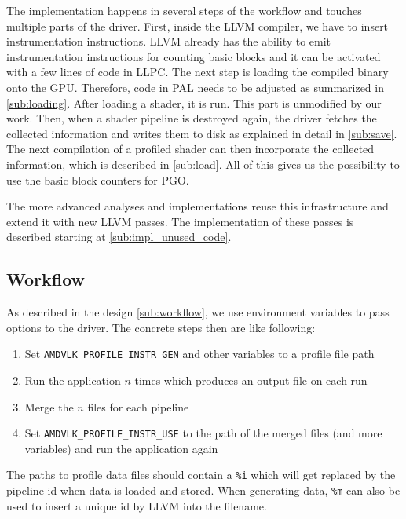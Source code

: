 \clearpage
{}
The implementation happens in several steps of the workflow and touches multiple parts of the driver.
First, inside the LLVM compiler, we have to insert instrumentation instructions.
LLVM already has the ability to emit instrumentation instructions for counting basic blocks and it can be activated with a few lines of code in LLPC.
The next step is loading the compiled binary onto the GPU. Therefore, code in PAL needs to be adjusted as summarized in \cref{sub:loading}.
After loading a shader, it is run. This part is unmodified by our work.
Then, when a shader pipeline is destroyed again, the driver fetches the collected information and writes them to disk as explained in detail in \cref{sub:save}.
The next compilation of a profiled shader can then incorporate the collected information, which is described in \cref{sub:load}. All of this gives us the possibility to use the basic block counters for PGO.

The more advanced analyses and implementations reuse this infrastructure and extend it with new LLVM passes. The implementation of these passes is described starting at \cref{sub:impl_unused_code}.

\subsection{Workflow}
\label{sub:impl_workflow}
As described in the design \cref{sub:workflow}, we use environment variables to pass options to the driver.
The concrete steps then are like following:
\begin{enumerate}
	\item Set \texttt{AMDVLK\_PROFILE\_INSTR\_GEN} and other variables to a profile file path
	\item Run the application $n$ times which produces an output file on each run
	\item Merge the $n$ files for each pipeline
	\item Set \texttt{AMDVLK\_PROFILE\_INSTR\_USE} to the path of the merged files (and more variables) and run the application again
\end{enumerate}
The paths to profile data files should contain a \texttt{\%i} which will get replaced by the pipeline id when data is loaded and stored.
When generating data, \texttt{\%m} can also be used to insert a unique id by LLVM into the filename.

